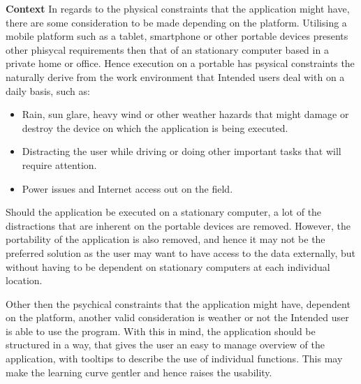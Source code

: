 \textbf{Context}\newline
In regards to the physical constraints that the application might have, there are some consideration to be made depending on the platform. Utilising a mobile platform such as a tablet, smartphone or other portable devices presents other phisycal requirements then that of an stationary computer based in a private home or office. Hence execution on a portable has psysical constraints the naturally derive from the work environment that Intended users deal with on a daily basis, such as:
\begin{itemize}[noitemsep]
    \item Rain, sun glare, heavy wind or other weather hazards that might damage or destroy the device on which the application is being executed.
    \item Distracting the user while driving or doing other important tasks that will require attention.
    \item Power issues and Internet access out on the field.
\end{itemize}
Should the application be executed on a stationary computer, a lot of the distractions that are inherent on the portable devices are removed. However, the portability of the application is also removed, and hence it may not be the preferred solution as the user may want to have access to the data externally, but without having to be dependent on stationary computers at each individual location.

Other then the psychical constraints that the application might have, dependent on the platform, another valid consideration is weather or not the Intended user is able to use the program. With this in mind, the application should be structured in a way, that gives the user an easy to manage overview of the application, with tooltips to describe the use of individual functions. This may make the learning curve gentler and hence raises the usability.

